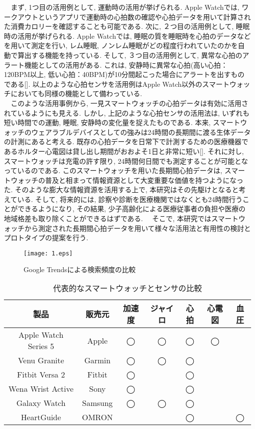 \documentclass[report, 11pt, a4paper]{jsbook}
\begin{document}
　まず, 1つ目の活用例として, 運動時の活用が挙げられる. Apple Watchでは, ワークアウトというアプリで運動時の心拍数の確認や心拍データを用いて計算された消費カロリーを確認することも可能である. 次に, ２つ目の活用例として, 睡眠時の活用が挙げられる. Apple Watchでは, 睡眠の質を睡眠時を心拍のデータなどを用いて測定を行い, レム睡眠, ノンレム睡眠がどの程度行われていたのかを自動で算出する機能を持っている. そして, ３つ目の活用例として, 異常な心拍のアラート機能としての活用がある. これは, 安静時に異常な心拍(高い心拍：120BPM以上, 低い心拍：40BPM)が10分間起こった場合にアラートを出すものである[]. 以上のような心拍センサを活用例はApple Watch以外のスマートウォッチにおいても同様の機能として備わっている. \\
　このような活用事例から, 一見スマートウォッチの心拍データは有効に活用されているようにも見える. しかし, 上記のような心拍センサの活用法は, いずれも短い時間での運動, 睡眠, 安静時の変化量を捉えたものである. 本来, スマートウォッチのウェアラブルデバイスとしての強みは24時間の長期間に渡る生体データの計測にあると考える. 既存の心拍データを日常下で計測するための医療機器であるホルター心電図は貸し出し期間がおおよそ1日と非常に短い[]. それに対し, スマートウォッチは充電の許す限り, 24時間何日間でも測定することが可能となっているのである. このスマートウォッチを用いた長期間心拍データは, スマートウォッチの普及と相まって情報資源として大変重要な価値を持つようになった. そのような膨大な情報資源を活用する上で, 本研究はその先駆けとなると考えている. そして, 将来的には, 診察や診断を医療機関ではなくとも24時間行うことができるようになり, その結果, 少子高齢化による医療従事者の負担や医療の地域格差も取り除くことができるはずである.
　そこで, 本研究ではスマートウォッチから測定された長期間心拍データを用いて様々な活用法と有用性の検討とプロトタイプの提案を行う.  

\begin{figure}[H]
\centering
\texttt{[image: 1.eps]}
\caption{Google Trendsによる検索頻度の比較}
\label{fig:goolge_trends}
\end{figure}

\begin{table}[H]
\centering
\caption{代表的なスマートウォッチとセンサの比較}
\begin{tabular}{ccccccc}
\hline
製品                   & 販売元     & 加速度 & ジャイロ & 心拍 & 心電図 & 血圧 \\ \hline
Apple Watch Series 5 & Apple   & ◯   & ◯    & ◯  & ◯   &    \\
Venu Granite         & Garmin  & ◯   & ◯    & ◯  &     &    \\
Fitbit Versa 2       & Fitbit  & ◯   &      & ◯  &     &    \\
Wena Wrist Active    & Sony    & ◯   &      & ◯  &     &    \\
Galaxy Watch         & Samsung & ◯   & ◯    & ◯  &     &    \\
HeartGuide           & OMRON   &     &      & ◯  &     & ◯  \\ \hline
\end{tabular}
\end{table}
　
\end{document}
